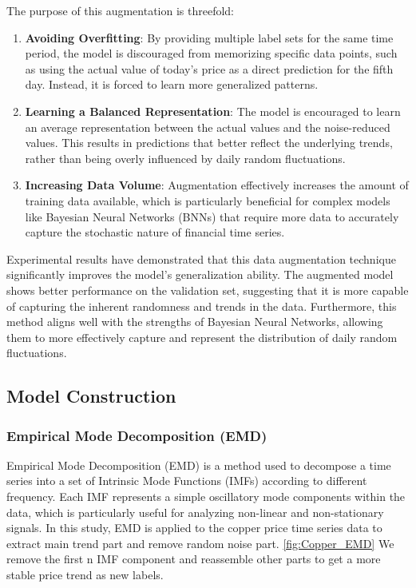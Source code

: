 \documentclass[final-report]{report-template}
\begin{document}
The purpose of this augmentation is threefold:
\begin{enumerate}
    \item \textbf{Avoiding Overfitting}: By providing multiple label sets for the same time period, the model is discouraged from memorizing specific data points, such as using the actual value of today's price as a direct prediction for the fifth day. Instead, it is forced to learn more generalized patterns.
    \item \textbf{Learning a Balanced Representation}: The model is encouraged to learn an average representation between the actual values and the noise-reduced values. This results in predictions that better reflect the underlying trends, rather than being overly influenced by daily random fluctuations.
    \item \textbf{Increasing Data Volume}: Augmentation effectively increases the amount of training data available, which is particularly beneficial for complex models like Bayesian Neural Networks (BNNs) that require more data to accurately capture the stochastic nature of financial time series.
\end{enumerate}

Experimental results have demonstrated that this data augmentation technique significantly improves the model's generalization ability. The augmented model shows better performance on the validation set, suggesting that it is more capable of capturing the inherent randomness and trends in the data. Furthermore, this method aligns well with the strengths of Bayesian Neural Networks, allowing them to more effectively capture and represent the distribution of daily random fluctuations.

\subsection{Model Construction}

\subsubsection{\textbf{Empirical Mode Decomposition (EMD)}}
Empirical Mode Decomposition (EMD) is a method used to decompose a time series into a set of Intrinsic Mode Functions (IMFs) according to different frequency.  Each IMF represents a simple oscillatory mode components within the data, which is particularly useful for analyzing non-linear and non-stationary signals. In this study, EMD is applied to the copper price time series data to extract main trend part and remove random noise part. \ref{fig:Copper_EMD} We remove the first n IMF component and reassemble other parts to get a more stable price trend as new labels.
\end{document}
